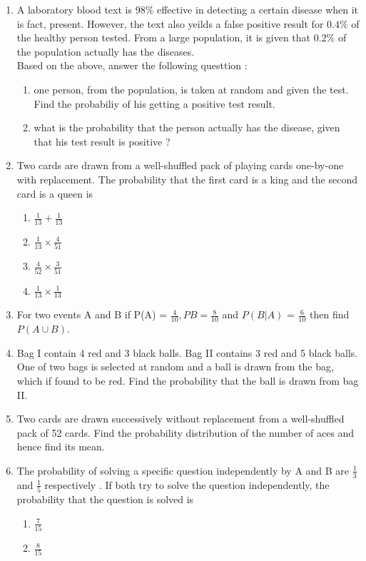 \begin{enumerate}
\item A laboratory blood text is $98\%$ effective  in detecting a certain disease when it is fact, present. However, the text also yeilds a false positive result for $0.4\%$ of the healthy person tested. From a large population, it is given that $0.2\%$ of the population actually has the diseases.
\\Based on the above, answer the following questtion : 
\begin{enumerate}
\item one person, from the population, is taken at random and given the test. Find the probabiliy of his getting a positive test result.
\item what is the probability that the person actually has the disease, given that his test result is positive ?
\end{enumerate}
\item Two cards are drawn from a well-shuffled pack of playing cards one-by-one with replacement. The probability that the first card is a king and the second card is a queen is 
\begin{enumerate}
\item $\frac{1}{13} + \frac{1}{13}$
\item $ \frac{1}{13} \times \frac{4}{51}$
\item $\frac{4}{52} \times \frac{3}{51}$
\item $\frac{1}{13} \times \frac{1}{13}$
\end{enumerate}
\item For two events A and B if P(A) = $\frac{4}{10}, P{B} = \frac{8}{10}$ and $P(B|A)$ = $\frac{6}{10}$ then find $P( A \cup B).$
\item Bag I contain 4 red and 3 black balls. Bag II contains 3 red and 5 black balls. One of two bags is selected at random and a ball is drawn from the bag, which if found to be red. Find the probability that the ball is drawn from bag II.
\item Two cards are drawn successively without replacement from a well-shuffled pack of 52 cards. Find the probability distribution of the number of aces and hence find its mean.
\item The probability of solving a specific question independently by A and B are $\frac{1}{3}$ and $\frac{1}{5}$ respectively . If both try to solve the question independently, the probability that the question is solved is 
\begin{enumerate}
\item $\frac{7}{15}$
\item $\frac{8}{15}$

\end{enumerate}
\end{enumerate}

